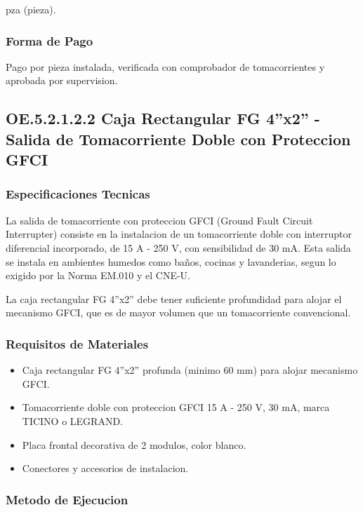 pza (pieza).

\subsubsection{Forma de Pago}

Pago por pieza instalada, verificada con comprobador de tomacorrientes y aprobada por supervision.

\subsection{OE.5.2.1.2.2 Caja Rectangular FG 4''x2'' - Salida de Tomacorriente Doble con Proteccion GFCI}

\subsubsection{Especificaciones Tecnicas}

La salida de tomacorriente con proteccion GFCI (Ground Fault Circuit Interrupter) consiste en la instalacion de un tomacorriente doble con interruptor diferencial incorporado, de 15 A - 250 V, con sensibilidad de 30 mA. Esta salida se instala en ambientes humedos como baños, cocinas y lavanderias, segun lo exigido por la Norma EM.010 y el CNE-U.

La caja rectangular FG 4''x2'' debe tener suficiente profundidad para alojar el mecanismo GFCI, que es de mayor volumen que un tomacorriente convencional.

\subsubsection{Requisitos de Materiales}

\begin{itemize}
  \item Caja rectangular FG 4''x2'' profunda (minimo 60 mm) para alojar mecanismo GFCI.
  \item Tomacorriente doble con proteccion GFCI 15 A - 250 V, 30 mA, marca TICINO o LEGRAND.
  \item Placa frontal decorativa de 2 modulos, color blanco.
  \item Conectores y accesorios de instalacion.
\end{itemize}

\subsubsection{Metodo de Ejecucion}


